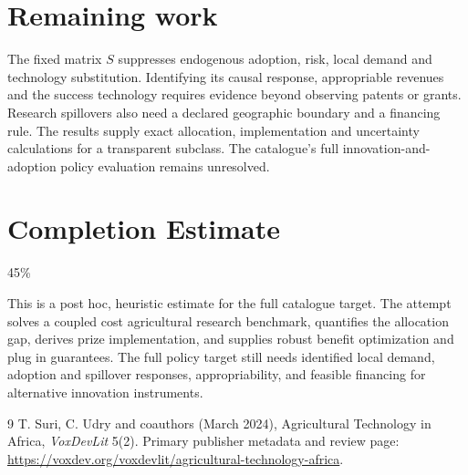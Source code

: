 \documentclass[11pt]{article}
\begin{document}
\section*{Remaining work}
The fixed matrix $S$ suppresses endogenous adoption, risk, local demand and technology substitution. Identifying its causal response, appropriable revenues and the success technology requires evidence beyond observing patents or grants. Research spillovers also need a declared geographic boundary and a financing rule. The results supply exact allocation, implementation and uncertainty calculations for a transparent subclass. The catalogue's full innovation-and-adoption policy evaluation remains unresolved.

\section{Completion Estimate}
45\%

This is a post hoc, heuristic estimate for the full catalogue target.
The attempt solves a coupled cost agricultural research benchmark, quantifies the allocation gap, derives prize implementation, and supplies robust benefit optimization and plug in guarantees. The full policy target still needs identified local demand, adoption and spillover responses, appropriability, and feasible financing for alternative innovation instruments.

\begin{thebibliography}{9}
 T. Suri, C. Udry and coauthors (March 2024), Agricultural Technology in Africa, \emph{VoxDevLit} 5(2). Primary publisher metadata and review page:
\url{https://voxdev.org/voxdevlit/agricultural-technology-africa}.
\end{thebibliography}
\end{document}
